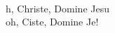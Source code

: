\begin{cancion}[Oh, Christe][Taizé]%
	  \\
	h, Christe, Domine Jesu\\
	oh, Ciste, Domine Je!\\
\end{cancion}%
